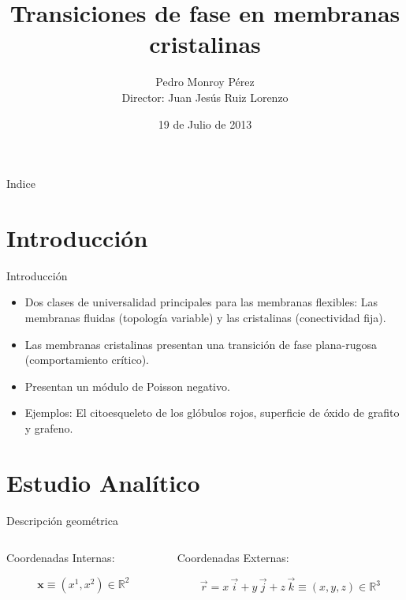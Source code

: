 \documentclass[xcolor=dvipsnames]{beamer}
\title[Trans. de fase en membranas cristalinas]{Transiciones de fase en
  membranas cristalinas}
\author[P. Monroy Dir.: Juan J.Ruiz Lorenzo]{Pedro Monroy Pérez \\ Director:
  Juan Jesús Ruiz Lorenzo}
\date{19 de Julio de 2013}
\institute[UEx]{Dep. de Física, Facultad de Ciencias, Universidad de Extremadura}
\begin{document}
\decimalpoint
\begin{frame}[plain]{}
\titlepage
\end{frame}


\begin{frame}{Indice}
  \tableofcontents[hideallsubsections]
\end{frame}
\section{Introducción}
\begin{frame}{Introducción}
\begin{itemize}
\item Dos clases de universalidad principales para las membranas flexibles:
  Las membranas fluidas (topología variable) y las cristalinas (conectividad fija). 
\item Las membranas cristalinas presentan una transición de fase plana-rugosa
  (comportamiento crítico).
\item Presentan un módulo de Poisson negativo.
\item Ejemplos: El citoesqueleto de los glóbulos rojos, superficie de óxido de grafito y grafeno. 
\end{itemize}
\end{frame}
\section{Estudio Analítico}

\begin{frame}{Descripción geométrica}
  \begin{columns}
    \begin{column}{5.8cm}
      \centering
      Coordenadas Internas:
      \begin{figure}[h]
        \resizebox{\columnwidth}{!}{}
      \end{figure}
      \begin{equation*}
        \mathbf{x}\equiv (x^1,x^2)\in \mathbb{R}^2
      \end{equation*}
    \end{column}
    \begin{column}{5.8cm}
      \centering
      Coordenadas Externas:
      \begin{figure}[h]
        \resizebox{\columnwidth}{!}{}
      \end{figure}
      \begin{equation*}
        \vec{r}=x\,\vec{i}+y\,\vec{j}+z\,\vec{k}\equiv (x,y,z)\in \mathbb{R}^3
      \end{equation*}
    \end{column}
  \end{columns}
\end{frame}
\end{document}
